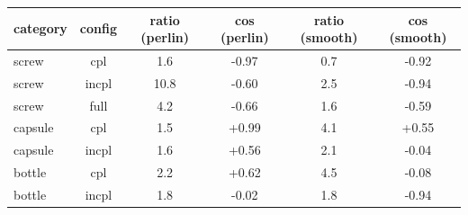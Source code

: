 \setlength{\tabcolsep}{3pt}
\begin{tabular}{@{}lccccc@{}}
\toprule
category & config & ratio (perlin) & cos (perlin) & ratio (smooth) & cos (smooth) \\
\midrule
screw & cpl & 1.6 & -0.97 & 0.7 & -0.92 \\
screw & incpl & 10.8 & -0.60 & 2.5 & -0.94 \\
screw & full & 4.2 & -0.66 & 1.6 & -0.59 \\
capsule & cpl & 1.5 & +0.99 & 4.1 & +0.55 \\
capsule & incpl & 1.6 & +0.56 & 2.1 & -0.04 \\
bottle & cpl & 2.2 & +0.62 & 4.5 & -0.08 \\
bottle & incpl & 1.8 & -0.02 & 1.8 & -0.94 \\
\bottomrule
\end{tabular}
